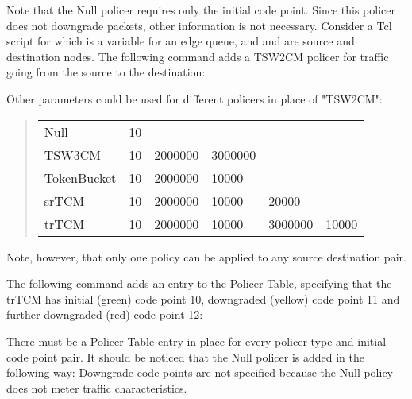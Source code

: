 Note that the Null policer requires only the initial code point. Since
this policer does not downgrade packets, other information is not necessary.  
Consider a Tcl script for which 
   is a variable for an edge queue, 
  and  and  are source and destination nodes.   
The following command adds a TSW2CM policer for traffic going from 
  the source to the destination:


Other parameters could be used for different policers 
  in place of "TSW2CM":

\begin{quote}
\begin{tabular}{llllll}
Null&10\\
TSW3CM&10&2000000&3000000\\
TokenBucket&10&2000000&10000\\
srTCM&10&2000000&10000&20000\\
trTCM&10&2000000&10000&3000000&10000
\end{tabular}
\end{quote}

Note, however, 
  that only one policy can be applied to any source destination pair.

The following command adds an entry to the Policer Table, 
  specifying that the trTCM has
  initial (green) code point 10, downgraded (yellow) code point 11 
  and further downgraded (red) code point 12:


There must be a Policer Table entry in place for every 
policer type and initial code point pair.
It should be noticed that the Null policer is added in the following way:
Downgrade code points are not specified because the Null policy does not
meter traffic characteristics.


